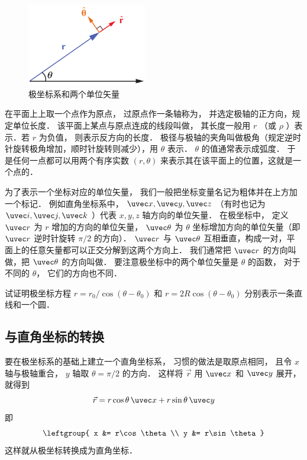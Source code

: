 
\begin{figure}[ht]
\centering
\includegraphics[width=5.2cm]{./figures/Polar1.pdf}
\caption{极坐标系和两个单位矢量}
\end{figure}

在平面上上取一个点作为原点， 过原点作一条轴称为， 并选定极轴的正方向，规定单位长度． 该平面上某点与原点连成的线段叫做， 其长度一般用 $r$ （或 $\rho$ ）表示．若 $r$ 为负值， 则表示反方向的长度． 极径与极轴的夹角叫做极角（规定逆时针旋转极角增加，顺时针旋转则减少），用 $\theta $ 表示． $\theta$ 的值通常表示成弧度． 于是任何一点都可以用两个有序实数 $(r,\theta)$ 来表示其在该平面上的位置，这就是一个点的．

为了表示一个坐标对应的单位矢量， 我们一般把坐标变量名记为粗体并在上方加一个标记． 例如直角坐标系中， $\uvec x, \uvec y, \uvec z$ （有时也记为 $\uvec i, \uvec j, \uvec k$ ）代表 $x,y,z$ 轴方向的单位矢量． 在极坐标中， 定义 $\uvec r$ 为 $r$ 增加的方向的单位矢量， $\uvec \theta$ 为 $\theta$ 坐标增加方向的单位矢量（即 $\uvec r$ 逆时针旋转 $\pi/2$ 的方向）． $\uvec r$ 与 $\uvec \theta$ 互相垂直，构成一对，平面上的任意矢量都可以正交分解到这两个方向上． 我们通常把 $\uvec r$ 的方向叫做，把 $\uvec \theta $ 的方向叫做． 要注意极坐标中的两个单位矢量是 $\theta$ 的函数， 对于不同的 $\theta$， 它们的方向也不同．

\begin{exer}{}
试证明极坐标方程 $r = r_0/\cos(\theta - \theta_0)$ 和 $r = 2R\cos(\theta - \theta_0)$ 分别表示一条直线和一个圆．
\end{exer}

\subsection{与直角坐标的转换}
要在极坐标系的基础上建立一个直角坐标系， 习惯的做法是取原点相同， 且令 $x$ 轴与极轴重合， $y$ 轴取 $\theta = \pi/2$ 的方向． 这样将 $\vec r$ 用 $\uvec x$ 和 $\uvec y$ 展开， 就得到
\begin{equation}
\vec r = r\cos\theta\,\uvec x + r\sin\theta\,\uvec y
\end{equation}
即
\begin{equation}\label{Polar_eq2}
\leftgroup{
x &= r\cos\theta\\
y &= r\sin\theta}
\end{equation}
这样就从极坐标转换成为直角坐标．

